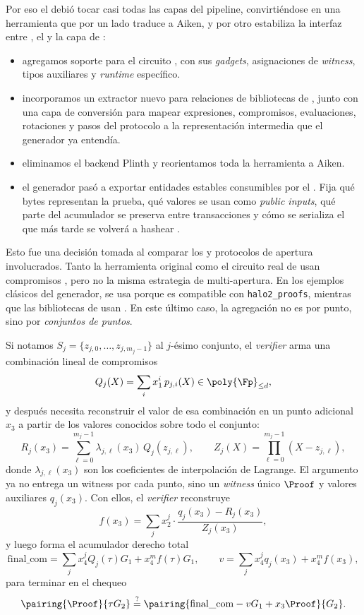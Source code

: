 Por eso el \fork debió tocar casi todas las capas del pipeline, convirtiéndose en una herramienta que por un lado traduce \Midnight a Aiken, y por otro estabiliza la interfaz entre \Mithril, el \ZkBridgeOperator y la capa \Onchain de \Cardano:
\begin{itemize}[noitemsep]
	\item agregamos soporte para el circuito \MidnightSTMCircuit, con sus \textit{gadgets}, asignaciones de \textit{witness}, tipos auxiliares y \textit{runtime} específico.
	\item incorporamos un extractor nuevo para relaciones de bibliotecas de \Midnight, junto con una capa de conversión para mapear expresiones, compromisos, evaluaciones, rotaciones y pasos del protocolo a la representación intermedia que el generador ya entendía.
	\item eliminamos el backend Plinth y reorientamos toda la herramienta a Aiken.
	\item el generador pasó a exportar entidades estables consumibles por el \zkBridge. Fija qué bytes representan la prueba, qué valores se usan como \textit{public inputs}, qué parte del acumulador se preserva entre transacciones y cómo se serializa el \ReducedRedeemer que más tarde se volverá a hashear \Onchain.
\end{itemize}

Esto fue una decisión tomada al comparar los \PCS y protocolos de apertura involucrados. Tanto la herramienta \HaloTwoMultiOpen original como el circuito real de \Mithril usan compromisos \KZG \cite{Kate2010}, pero no la misma estrategia de multi-apertura. En los ejemplos clásicos del generador, se usa \GWCNineteen porque es compatible con \texttt{halo2\_proofs}, mientras que las bibliotecas de \Midnight usan \HaloTwoMultiOpen. En este último caso, la agregación no es por punto, sino por \emph{conjuntos de puntos}.

Si notamos $S_j=\{z_{j,0},\ldots,z_{j,m_j-1}\}$ al $j$-ésimo conjunto, el \textit{verifier} arma una combinación lineal de compromisos
$$Q_j(X)=\sum_i x_1^i\,p_{j,i}(X) \in \poly{\Fp}_{\leq d},$$
y después necesita reconstruir el valor de esa combinación en un punto adicional $x_3$ a partir de los valores conocidos sobre todo el conjunto:
$$R_j(x_3) = \sum_{\ell = 0}^{m_j - 1}\lambda_{j,\ell}(x_3) \, Q_j(z_{j, \ell}), \qquad Z_j(X) = \prod_{\ell = 0}^{m_j - 1}(X - z_{j, \ell}),$$
donde $\lambda_{j,\ell}(x_3)$ son los coeficientes de interpolación de Lagrange. El argumento ya no entrega un witness por cada punto, sino un \textit{witness} único $\Proof$ y valores auxiliares $q_j(x_3)$. Con ellos, el \textit{verifier} reconstruye
$$f(x_3) = \sum_j x_2^j\cdot \frac{q_j(x_3)-R_j(x_3)}{Z_j(x_3)},$$
y luego forma el acumulador derecho total
$$\mathrm{final\_com}=\sum_j x_4^j Q_j(\tau)G_1+x_4^{m}f(\tau)G_1, \qquad v = \sum_j x_4^j q_j(x_3)+x_4^{m}f(x_3),$$
para terminar en el chequeo
$$\pairing{\Proof}{\tau G_2} \stackrel{?}{=} \pairing{\mathrm{final\_com} - vG_1 + x_3\Proof}{G_2}.$$

